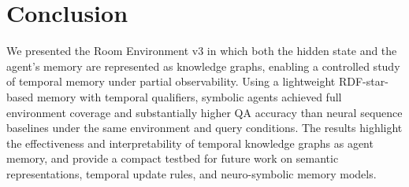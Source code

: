 \documentclass[11pt]{article}
\begin{document}
\section{Conclusion}

We presented the Room Environment v3 in which both the hidden state and the agent’s memory are represented as knowledge graphs, enabling a controlled study of temporal memory under partial observability. Using a lightweight RDF-star-based memory with temporal qualifiers, symbolic agents achieved full environment coverage and substantially higher QA accuracy than neural sequence baselines under the same environment and query conditions. The results highlight the effectiveness and interpretability of temporal knowledge graphs as agent memory, and provide a compact testbed for future work on semantic representations, temporal update rules, and neuro-symbolic memory models.



\end{document}
